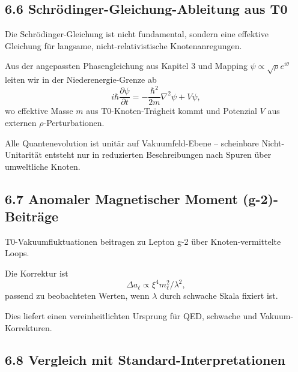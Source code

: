 	\subsection{6.6 Schrödinger-Gleichung-Ableitung aus T0}
	
	Die Schrödinger-Gleichung ist nicht fundamental, sondern eine effektive Gleichung für langsame, nicht-relativistische Knotenanregungen.
	
	Aus der angepassten Phasengleichung aus Kapitel 3 und Mapping $\psi \propto \sqrt{\rho} e^{i\theta}$ leiten wir in der Niederenergie-Grenze ab
	\[
	i \hbar \frac{\partial \psi}{\partial t} = -\frac{\hbar^2}{2m} \nabla^2 \psi + V \psi,
	\]
	wo effektive Masse $m$ aus T0-Knoten-Trägheit kommt und Potenzial $V$ aus externen $\rho$-Perturbationen.
	
	Alle Quantenevolution ist unitär auf Vakuumfeld-Ebene – scheinbare Nicht-Unitarität entsteht nur in reduzierten Beschreibungen nach Spuren über umweltliche Knoten.
	
	\subsection{6.7 Anomaler Magnetischer Moment (g-2)-Beiträge}
	
	T0-Vakuumfluktuationen beitragen zu Lepton g-2 über Knoten-vermittelte Loops.
	
	Die Korrektur ist
	\[
	\Delta a_\ell \propto \xi^4 m_\ell^2 / \lambda^2,
	\]
	passend zu beobachteten Werten, wenn $\lambda$ durch schwache Skala fixiert ist.
	
	Dies liefert einen vereinheitlichten Ursprung für QED, schwache und Vakuum-Korrekturen.
	
	\subsection{6.8 Vergleich mit Standard-Interpretationen}
	
	\begin{table}[htbp]
		\centering
		\caption{Quanteninterpretation-Vergleich}
		\label{tab:quanten}
	\end{table}
	
